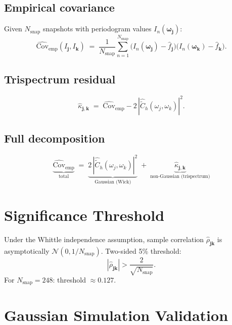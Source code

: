 \documentclass[12pt]{article}
\theoremstyle{definition}
\begin{document}
\subsection{Empirical covariance}

Given $N_{\mathrm{snap}}$ snapshots with periodogram values $I_n(\boldsymbol{\omega}_{\mathbf{j}})$:
\[
  \widehat{\mathrm{Cov}}_{\mathrm{emp}}(I_{\mathbf{j}},I_{\mathbf{k}})
  \;=\; \frac{1}{N_{\mathrm{snap}}}\sum_{n=1}^{N_{\mathrm{snap}}}
    \bigl(I_n(\boldsymbol{\omega}_{\mathbf{j}}) - \hat{f}_{\mathbf{j}}\bigr)
    \bigl(I_n(\boldsymbol{\omega}_{\mathbf{k}}) - \hat{f}_{\mathbf{k}}\bigr).
\]

\subsection{Trispectrum residual}

\[
  \hat{\kappa}_{\mathbf{j},\mathbf{k}}
  \;=\; \widehat{\mathrm{Cov}}_{\mathrm{emp}} - 2\,|\hat{\tilde{C}}_h(\omega_j,\omega_k)|^2.
\]

\subsection{Full decomposition}

\[
  \underbrace{\widehat{\mathrm{Cov}}_{\mathrm{emp}}}_{\text{total}}
  \;=\;
  \underbrace{2\,|\hat{\tilde{C}}_h(\omega_j,\omega_k)|^2}_{\text{Gaussian (Wick)}}
  \;+\;
  \underbrace{\hat{\kappa}_{\mathbf{j},\mathbf{k}}}_{\text{non-Gaussian (trispectrum)}}
\]


\section{Significance Threshold}
\label{sec:threshold}

Under the Whittle independence assumption, sample correlation
$\hat\rho_{\mathbf{jk}}$ is asymptotically $\mathcal{N}(0, 1/N_{\mathrm{snap}})$.
Two-sided 5\% threshold:
\[
  |\hat\rho_{\mathbf{jk}}| > \frac{2}{\sqrt{N_{\mathrm{snap}}}}.
\]
For $N_{\mathrm{snap}} = 248$: threshold $\approx 0.127$.


\section{Gaussian Simulation Validation}
\label{sec:validation}
\end{document}
